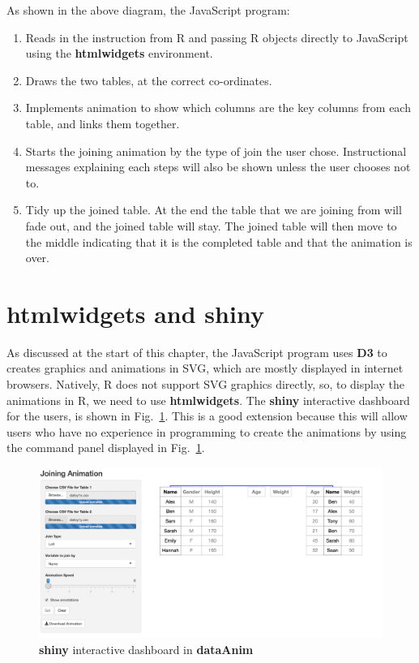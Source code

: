 As shown in the above diagram, the \textsf{JavaScript} program:

\begin{enumerate}
    \item Reads in the instruction from \textsf{R} and passing \textsf{R} objects directly to \textsf{JavaScript} using the \textbf{htmlwidgets} environment.
    \item Draws the two tables, at the correct co-ordinates.
    \item Implements animation to show which columns are the key columns from each table, and links them together.
    \item Starts the joining animation by the type of join the user chose. Instructional messages explaining each steps will also be shown unless the user chooses not to.
    \item Tidy up the joined table. At the end the table that we are joining from will fade out, and the joined table will stay. The joined table will then move to the middle indicating that it is the completed table and that the animation is over.
\end{enumerate}

\section{\textbf{htmlwidgets} and \textbf{shiny}}

As discussed at the start of this chapter, the \textsf{JavaScript} program uses \textbf{D3} to creates graphics and animations in SVG, which are mostly displayed in internet browsers. Natively, \textsf{R} does not support SVG graphics directly, so, to display the animations in \textsf{R}, we need to use \textbf{htmlwidgets}. The \textbf{shiny} interactive dashboard for the users, is shown in Fig.~\ref{fig:shinydash}. This is a good extension because this will allow users who have no experience in programming to create the animations by using the command panel displayed in Fig.~\ref{fig:shinydash}.

\begin{figure}[H]
    \includegraphics[scale = 0.3]{Masters-Thesis/img/shinydash.png}
    \caption{ \textbf{shiny} interactive dashboard in \textbf{dataAnim}}
    \label{fig:shinydash}
\end{figure}

